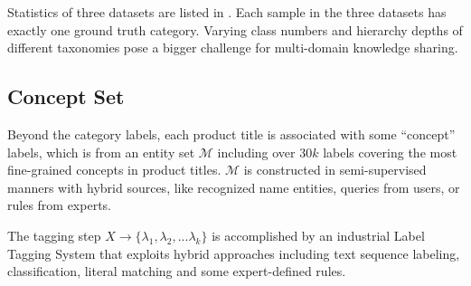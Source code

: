 
Statistics of 
three datasets are listed in . 
Each sample in the three datasets has exactly one ground truth category.
Varying class numbers and hierarchy depths of different taxonomies pose a bigger challenge for multi-domain knowledge sharing.
\subsection{Concept Set}
\label{sec: dataset}
Beyond the category labels, each product title is associated with some ``concept'' labels, which is from an entity set $\mathcal{M}$ including over $30k$ labels covering the most fine-grained concepts in product titles. $\mathcal{M}$ is constructed in semi-supervised manners with hybrid sources, like recognized name entities, queries from users, or rules from experts.

The tagging step $X \rightarrow \{\lambda_1, \lambda_2, ... \lambda_k\}$ is accomplished by an industrial Label Tagging System that exploits hybrid approaches including text sequence labeling, classification, literal matching and some expert-defined rules.
